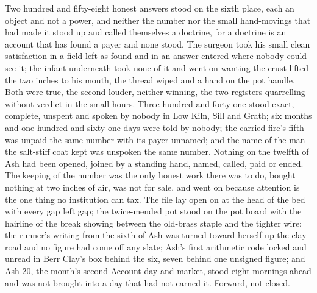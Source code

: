 Two hundred and fifty-eight honest answers stood on the sixth place, each an object and not a power, and neither the number nor the small hand-movings that had made it stood up and called themselves a doctrine, for a doctrine is an account that has found a payer and none stood. The surgeon took his small clean satisfaction in a field left as found and in an answer entered where nobody could see it; the infant underneath took none of it and went on wanting the crust lifted the two inches to his mouth, the thread wiped and a hand on the pot handle. Both were true, the second louder, neither winning, the two registers quarrelling without verdict in the small hours. Three hundred and forty-one stood exact, complete, unspent and spoken by nobody in Low Kiln, Sill and Grath; six months and one hundred and sixty-one days were told by nobody; the carried fire's fifth was unpaid the same number with its payer unnamed; and the name of the man the salt-stiff coat kept was unspoken the same number. Nothing on the twelfth of Ash had been opened, joined by a standing hand, named, called, paid or ended. The keeping of the number was the only honest work there was to do, bought nothing at two inches of air, was not for sale, and went on because attention is the one thing no institution can tax. The file lay open on  at the head of the bed with every gap left gap; the twice-mended pot stood on the pot board with the hairline of the break showing between the old-brass staple and the tighter wire; the runner's writing from the sixth of Ash was turned toward herself up the clay road and no figure had come off any slate; Ash's first arithmetic rode locked and unread in Berr Clay's box behind the six, seven behind one unsigned figure; and Ash 20, the month's second Account-day and market, stood eight mornings ahead and was not brought into a day that had not earned it. Forward, not closed.
